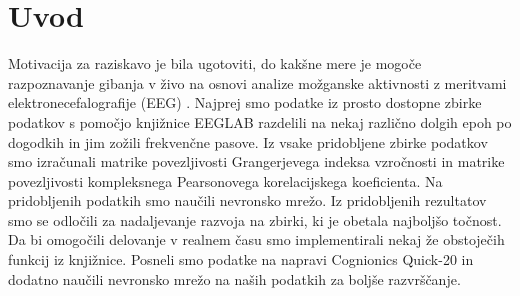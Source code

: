 \chapter{Uvod}
\thispagestyle{fancy}
Motivacija za raziskavo je bila ugotoviti, do kakšne mere je mogoče razpoznavanje gibanja v živo na osnovi analize možganske aktivnosti z meritvami elektronecefalografije (EEG) . Najprej smo podatke iz prosto dostopne zbirke podatkov s pomočjo knjižnice EEGLAB razdelili na nekaj različno dolgih epoh po dogodkih in jim zožili frekvenčne pasove. Iz vsake pridobljene zbirke podatkov smo izračunali matrike povezljivosti Grangerjevega indeksa vzročnosti in matrike povezljivosti kompleksnega Pearsonovega korelacijskega koeficienta. Na pridobljenih podatkih smo naučili nevronsko mrežo. Iz pridobljenih rezultatov smo se odločili za nadaljevanje razvoja na zbirki, ki je obetala najboljšo točnost. Da bi omogočili delovanje v realnem času smo implementirali nekaj že obstoječih funkcij iz knjižnice. Posneli smo podatke na napravi Cognionics Quick-20 in dodatno naučili nevronsko mrežo na naših podatkih za boljše razvrščanje.
\newpage
